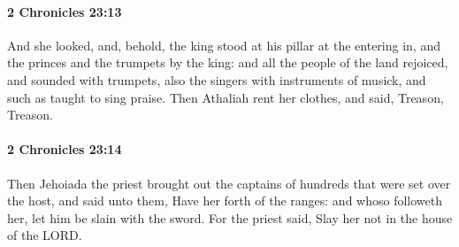 		\paragraph{2 Chronicles 23:13} %
			\label{2CHRONICLES-23-13}

			And she looked, and, behold, the king stood at his pillar at the entering in, and the princes and the trumpets by the king: and all the people of the land rejoiced, and sounded with trumpets, also the singers with instruments of musick, and such as taught to sing praise. Then Athaliah rent her clothes, and said, Treason, Treason.


		\paragraph{2 Chronicles 23:14} %
			\label{2CHRONICLES-23-14}

			Then Jehoiada the priest brought out the captains of hundreds that were set over the host, and said unto them, Have her forth of the ranges: and whoso followeth her, let him be slain with the sword. For the priest said, Slay her not in the house of the LORD.

